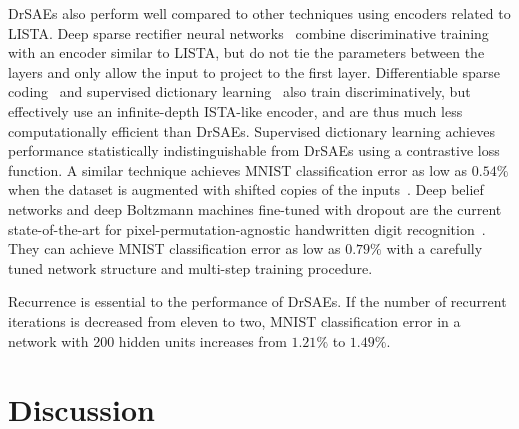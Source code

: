 \documentclass{article} %
\begin{document}
DrSAEs also perform well compared to other techniques using encoders related to LISTA.  Deep sparse rectifier neural networks~\citep{glorot2011} combine discriminative training with an encoder similar to LISTA, but do not tie the parameters between the layers and only allow the input to project to the first layer.  %
Differentiable sparse coding~\citep{bradley2008} and supervised dictionary learning~\citep{mairal2009} also train discriminatively, but effectively use an infinite-depth ISTA-like encoder, and are thus much less computationally efficient than DrSAEs.  Supervised dictionary learning achieves performance statistically indistinguishable from DrSAEs using a contrastive loss function. %
A similar technique achieves MNIST classification error as low as $0.54\%$ when the dataset is augmented with shifted copies of the inputs~\citep{mairal2012}.
Deep belief networks and deep Boltzmann machines fine-tuned with dropout are the current state-of-the-art for pixel-permutation-agnostic handwritten digit recognition~\citep{hinton2012}.  They can achieve MNIST classification error as low as $0.79\%$ with a carefully tuned network structure and multi-step training procedure.

Recurrence is essential to the performance of DrSAEs.  If the number of recurrent iterations is decreased from eleven to two, MNIST classification error in a network with 200 hidden units increases from $1.21\%$ to $1.49\%$.

\section{Discussion}
\end{document}
